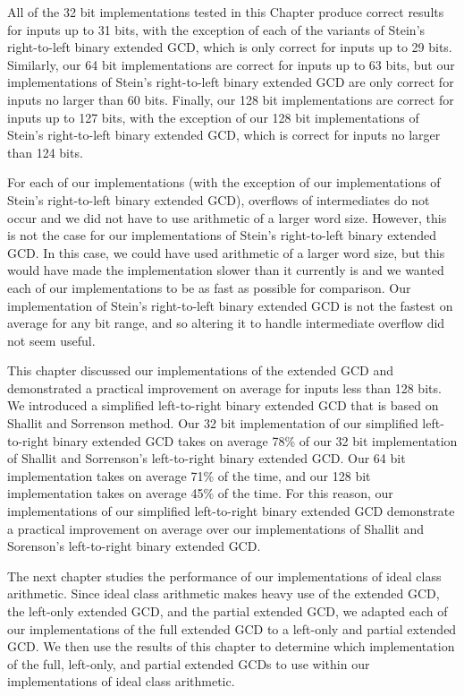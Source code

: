 \documentclass{ucalgthes1}
\theoremstyle{definition}
\begin{document}
All of the 32 bit implementations tested in this Chapter produce correct results for inputs up to 31 bits, with the exception of each of the variants of Stein's right-to-left binary extended GCD, which is only correct for inputs up to 29 bits.  Similarly, our 64 bit implementations are correct for inputs up to 63 bits, but our implementations of Stein's right-to-left binary extended GCD are only correct for inputs no larger than 60 bits.  Finally, our 128 bit implementations are correct for inputs up to 127 bits, with the exception of our 128 bit implementations of Stein's right-to-left binary extended GCD, which is correct for inputs no larger than 124 bits.

For each of our implementations (with the exception of our implementations of Stein's right-to-left binary extended GCD), overflows of intermediates do not occur and we did not have to use arithmetic of a larger word size.  However, this is not the case for our implementations of Stein's right-to-left binary extended GCD.  In this case, we could have used arithmetic of a larger word size, but this would have made the implementation slower than it currently is and we wanted each of our implementations to be as fast as possible for comparison.  Our implementation of Stein's right-to-left binary extended GCD is not the fastest on average for any bit range, and so altering it to handle intermediate overflow did not seem useful.

This chapter discussed our implementations of the extended GCD and demonstrated a practical improvement on average for inputs less than 128 bits.   We introduced a simplified left-to-right binary extended GCD that is based on Shallit and Sorrenson \cite{Shallit1994} method.  Our 32 bit implementation of our simplified left-to-right binary extended GCD takes on average 78\% of our 32 bit implementation of Shallit and Sorrenson's left-to-right binary extended GCD.   Our 64 bit implementation takes on average 71\% of the time, and our 128 bit implementation takes on average 45\% of the time.  For this reason, our implementations of our simplified left-to-right binary extended GCD demonstrate a practical improvement on average over our implementations of Shallit and Sorenson's left-to-right binary extended GCD.

The next chapter studies the performance of our implementations of ideal class arithmetic.  Since ideal class arithmetic makes heavy use of the extended GCD, the left-only extended GCD, and the partial extended GCD, we adapted each of our implementations of the full extended GCD to a left-only and partial extended GCD.  We then use the results of this chapter to determine which implementation of the full, left-only, and partial extended GCDs to use within our implementations of ideal class arithmetic.
\end{document}
